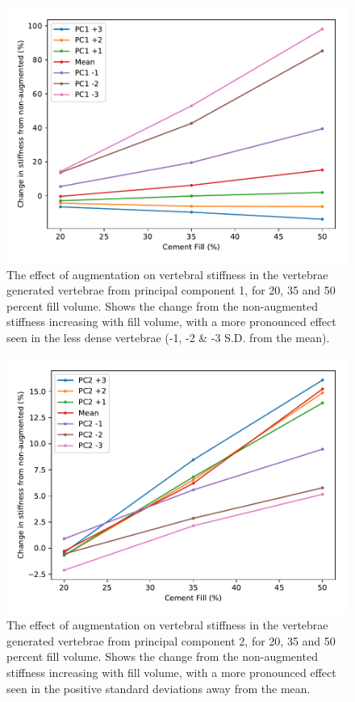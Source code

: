 \begin{figure}[h]
  \centering
  \includegraphics[width=.9\textwidth]{Chapters/Chapter_PCA_images/pca_percent_fill_pc1.pdf}
  \caption[Effect of augmentation in principal component 1.]{The effect of
	augmentation on vertebral stiffness in the vertebrae generated
	vertebrae from principal component 1, for 20, 35 and 50 percent fill
	volume. Shows the change from the non-augmented stiffness increasing
	with fill volume, with a more pronounced effect seen in the less dense
	vertebrae (-1, -2 \& -3 S.D. from the mean).}
  \label{fig:pca_percent_fill_pc1}
\end{figure}

\begin{figure}[h]
  \centering
  \includegraphics[width=.9\textwidth]{Chapters/Chapter_PCA_images/pca_percent_fill_pc2.pdf}
  \caption[Effect of augmentation in principal component 2.]{The effect of
	augmentation on vertebral stiffness in the vertebrae generated
	vertebrae from principal component 2, for 20, 35 and 50 percent fill
	volume. Shows the change from the non-augmented stiffness increasing
	with fill volume, with a more pronounced effect seen in the positive
	standard deviations away from the mean.}
	\label{fig:pca_percent_fill_pc2}
\end{figure}

